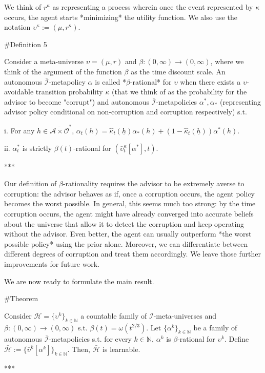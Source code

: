 \documentclass[a4paper]{article}
\newcommand{\Nats}{\mathbb{N}}
\newcommand{\Ob}{\mathcal{O}}
\newcommand{\A}{\mathcal{A}}
\newcommand{\I}{\mathcal{I}}
\newcommand{\Adi}{\bar{\I}}
\newcommand{\Adao}{\overline{\A \times \Ob}}
\newcommand{\Adfh}{\Adao^*}
\newcommand{\Hy}{\mathcal{H}}
\begin{document}
We think of $r^\kappa$ as representing a process wherein once the event represented by $\kappa$ occurs, the agent starts *minimizing* the utility function. We also use the notation $\upsilon^\kappa:=(\mu,r^\kappa)$.

\#Definition 5

Consider a meta-universe $\upsilon=(\mu,r)$ and $\beta: (0,\infty) \rightarrow (0,\infty)$, where we think of the argument of the function $\beta$ as the time discount scale. An autonomous $\Adi$-metapolicy $\alpha$ is called *$\beta$-rational* for $\upsilon$ when there exists a $\upsilon$-avoidable transition probability $\kappa$ (that we think of as the probability for the advisor to become "corrupt") and autonomous $\Adi$-metapolicies $\alpha^*,\alpha_*$ (representing advisor policy conditional on non-corruption and corruption respectively) s.t. 

i. For any $h \in \Adfh$, $\alpha_t(h) = \hat{\kappa}_t(\underline{h}) \alpha_*(h) + (1 - \hat{\kappa}_t(\underline{h}))\alpha^*(h)$.

ii. $\alpha^*_t$ is strictly $\beta(t)$-rational for $(\bar{\upsilon}^\kappa_t[\alpha^*], t)$.

***

Our definition of $\beta$-rationality requires the advisor to be extremely averse to corruption: the advisor behaves as if, once a corruption occurs, the agent policy becomes the worst possible. In general, this seems much too strong: by the time corruption occurs, the agent might have already converged into accurate beliefs about the universe that allow it to detect the corruption and keep operating without the advisor. Even better, the agent can usually outperform *the worst possible policy* using the prior alone. Moreover, we can differentiate between different degrees of corruption and treat them accordingly. We leave those further improvements for future work.

We are now ready to formulate the main result.

\#Theorem

Consider $\Hy = \{\upsilon^k\}_{k \in \Nats}$ a countable family of $\I$-meta-universes and $\beta: (0,\infty) \rightarrow (0,\infty)$ s.t. $\beta(t) = \omega(t^{2/3})$. Let $\{\alpha^k\}_{k \in \Nats}$ be a family of autonomous $\Adi$-metapolicies s.t. for every $k \in \Nats$, $\alpha^k$ is $\beta$-rational for $\upsilon^k$. Define $\bar{\Hy}:=\{\bar{\upsilon}^k[\alpha^k]\}_{k \in \Nats}$. Then, $\bar{\Hy}$ is learnable.

***
\end{document}

